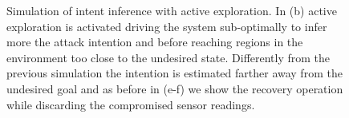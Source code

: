 \documentclass[letterpaper, 10 pt, conference]{ieeeconf}  %
\begin{document}
\begin{figure}[]
	\centering
	\vspace{-5pt}
	\caption{Simulation of intent inference with active exploration. In (b) active exploration is activated driving the system sub-optimally to infer more the attack intention and before reaching regions in the environment too close to the undesired state. Differently from the previous simulation the intention is estimated farther away from the undesired goal and as before in (e-f) we show the recovery operation while discarding the compromised sensor readings.}
	\label{fig:active-exploration}
\end{figure}
\end{document}
